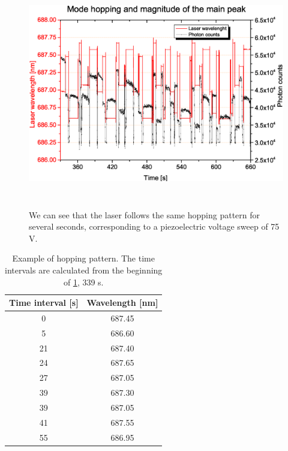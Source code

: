 \begin{figure}[!hbpt]\centering
\includegraphics[width=\linewidth, height=10cm, draft=\foto]{eps/periodicityofhops.eps}
\caption{We can see that the laser follows the same hopping pattern for several seconds, corresponding to a piezoelectric voltage sweep of 75 V.}
\label{hoppattern}
\end{figure}

\begin{table}[!hbpt]\centering
	\begin{tabular}{|c|c|}
	\hline	Time interval [s]&Wavelength [nm]\\
		\hline
0&687.45\\ \hline%
5&686.60\\ \hline
21&687.40\\ \hline
24&687.65\\ \hline
27&687.05\\ \hline
39&687.30\\ \hline
39&687.05\\ \hline
41&687.55\\ \hline
55&686.95\\ \hline
	\end{tabular}
\caption{Example of hopping pattern. The time intervals are calculated from the beginning of \cref{hoppattern}, 339 s.}
\label{tabrutta}
\end{table}


